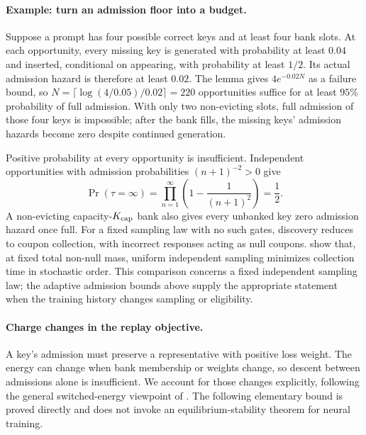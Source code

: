 \paragraph{Example: turn an admission floor into a budget.}
Suppose a prompt has four possible correct keys and at least four bank slots.
At each opportunity, every missing key is generated with probability at least
$0.04$ and inserted, conditional on appearing, with probability at least
$1/2$. Its actual admission hazard is therefore at least $0.02$. The lemma
gives $4e^{-0.02N}$ as a failure bound, so
$N=\lceil\log(4/0.05)/0.02\rceil=220$ opportunities suffice for at least
$95\%$ probability of full admission. With only two non-evicting slots,
full admission of those four keys is impossible; after the bank fills, the
missing keys' admission hazards become zero despite continued generation.

Positive probability at every opportunity is insufficient. Independent
opportunities with admission probabilities $(n+1)^{-2}>0$ give
\[
 \Pr(\tau=\infty)=\prod_{n=1}^\infty
 \left(1-\frac1{(n+1)^2}\right)=\frac12.
\]
A non-evicting capacity-$K_{\rm cap}$ bank also gives every unbanked key zero admission
hazard once full. For a fixed sampling law with no such gates, discovery
reduces to coupon collection, with incorrect responses acting as null
coupons. \citet[Theorems~2--3]{anceaume2015coupon} show that, at fixed total
non-null mass, uniform independent sampling minimizes collection time in
stochastic order. This comparison concerns a fixed independent sampling
law; the adaptive admission bounds above supply the appropriate statement
when the training history changes sampling or eligibility.

\paragraph{Charge changes in the replay objective.}
A key's admission must preserve a representative with positive loss weight.
The energy can change when bank membership or weights change, so descent
between admissions alone is insufficient. We account for those changes
explicitly, following the general switched-energy viewpoint of
\citet{branicky1998multiple}. The following elementary bound is proved
directly and does not invoke an equilibrium-stability theorem for neural
training.

